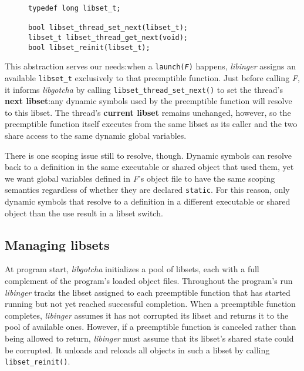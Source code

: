 \begin{figure}
\begin{lstlisting}[label=lst:gotchaapi,caption=libgotcha C interface]
typedef long libset_t;

bool libset_thread_set_next(libset_t);
libset_t libset_thread_get_next(void);
bool libset_reinit(libset_t);
\end{lstlisting}
\end{figure}

This abstraction serves our needs:\@ when a
\texttt{launch(\textnormal{\textit{F}})} happens, \textit{libinger} assigns an
available \texttt{libset\_t} exclusively to that preemptible function.  Just before
calling \textit{F}, it informs \textit{libgotcha} by calling
\texttt{libset\_thread\_set\_next()} to set the thread's \textbf{next libset}:\@ any
dynamic symbols used by the preemptible function will resolve to this libset.  The
thread's \textbf{current libset} remains
unchanged, however, so the preemptible function itself executes from the same libset
as its caller and the two share access to the same dynamic global variables.

There is one scoping issue still to resolve, though.  Dynamic symbols can resolve back
to a definition in the same executable or shared object that used them, yet we want
global variables defined in \textit{F}'s object file to have the same scoping
semantics regardless of whether they are declared \texttt{static}.  For this reason,
only dynamic symbols that resolve to a definition in a different executable or shared
object than the use result in a libset switch.


\subsection{Managing libsets}

At program start, \textit{libgotcha} initializes a pool of libsets, each with a full
complement of the program's loaded object files.  Throughout the program's run
\textit{libinger} tracks the libset assigned to each preemptible function that has
started running but not yet reached successful completion.  When a preemptible
function completes, \textit{libinger} assumes it has not corrupted its libset and
returns it to the pool of available ones.  However, if a preemptible function
is canceled rather than being allowed to return, \textit{libinger} must
assume that its libset's shared state could be corrupted.  It unloads and reloads
all objects in such a libset by calling \texttt{libset\_reinit()}.

